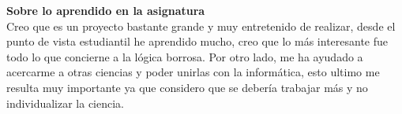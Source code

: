 \documentclass[letterpaper,12pt]{article}
\begin{document}
\textbf{Sobre lo aprendido en la asignatura} \\
Creo que es un proyecto bastante grande y muy entretenido de realizar, desde el punto de vista estudiantil he aprendido mucho, creo que lo más interesante fue todo lo que concierne a la lógica borrosa. Por otro lado, me ha ayudado a acercarme a otras ciencias y poder unirlas con la informática, esto ultimo me resulta muy importante ya que considero que se debería trabajar más y no individualizar la ciencia.
\end{document}
